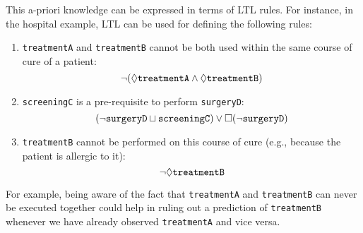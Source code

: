 This a-priori knowledge can be expressed in terms of LTL rules. For instance, in the hospital example, LTL can be used for defining the following rules:
\begin{enumerate}[1)]
\item \texttt{treatmentA} and \texttt{treatmentB} cannot be both used within the same course of cure of a patient:
  \begin{equation}
    \label{eq:LTL1}
    \neg(\lozenge \mathtt{treatmentA} \wedge \lozenge \mathtt{treatmentB})
  \end{equation}
\item \texttt{screeningC} is a pre-requisite to perform \texttt{surgeryD}:
  \begin{equation}
    \label{eq:LTL2}
    (\neg \mathtt{surgeryD} \sqcup \mathtt{screeningC}) \vee \square (\neg  \mathtt{surgeryD})
  \end{equation}
\item \texttt{treatmentB} cannot be performed on this course of cure (e.g., because the patient is allergic to it):
\begin{equation}
	\label{eq:LTL3}
	\neg \lozenge \mathtt{treatmentB}
\end{equation}
\end{enumerate}

For example, being aware of the fact that \texttt{treatmentA} and \texttt{treatmentB} can never be executed together could help in ruling out a prediction of \texttt{treatmentB} whenever we have already observed \texttt{treatmentA} and vice versa.



